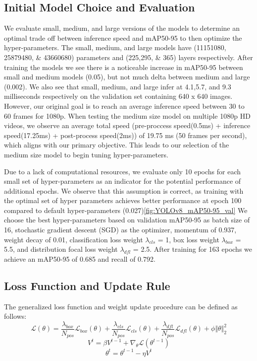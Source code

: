 \documentclass[10pt,twocolumn,letterpaper]{article}
\begin{document}
\subsection{Initial Model Choice and Evaluation}

We evaluate small, medium, and large versions of the models to determine an optimal trade off between inference speed and mAP50-95 to then optimize the hyper-parameters. The small, medium, and large models have (11151080, 25879480, \& 43660680) parameters and (225,295, \& 365) layers respectively. After training the models we see there is a noticeable increase in mAP50-95 between small and medium models (0.05), but not much delta between medium and large (0.002). We also see that small, medium, and large infer at 4.1,5.7, and 9.3 milliseconds respectively on the validation set containing 640 x 640 images. However, our original goal is to reach an average inference speed between 30 to 60 frames for 1080p. When testing the medium size model on multiple 1080p HD videos, we observe an average total speed (pre-proccess speed(0.5ms) + inference speed(17.25ms) + post-process speed(2ms)) of 19.75 ms (50 frames per second), which aligns with our primary objective. This leads to our selection of the medium size model to begin tuning hyper-parameters.

Due to a lack of computational resources, we evaluate only 10 epochs for each small set of hyper-parameters as an indicator for the potential performance of additional epochs. We observe that this assumption is correct, as training with the optimal set of hyper parameters achieves better performance at epoch 100 compared to default hyper-parameters (0.027)\ref{fig:YOLOv8_mAP50-95_val} We choose the best hyper-parameters based on validation mAP50-95 as batch size of 16, stochastic gradient descent (SGD) as the optimizer, momentum of 0.937, weight decay of 0.01, classification loss weight $\lambda_{cls}$ = 1, box loss weight $\lambda_{box}$ = 5.5, and distribution focal loss weight $\lambda_{dfl}$ = 2.5. After training for 163 epochs we achieve an mAP50-95 of 0.685 and recall of 0.792.

\subsection{Loss Function and Update Rule}
The generalized loss function and weight update procedure can be defined as follows: 
\begin{equation}\label{Generalized Loss}
\mathcal{L}(\theta) = \dfrac{\lambda_{box}}{N_{pos}}\mathcal{L}_{box}(\theta) + \dfrac{\lambda_{cls}}{N_{pos}}\mathcal{L}_{cls}(\theta) + \dfrac{\lambda_{dfl}}{N_{pos}}\mathcal{L}_{dfl}(\theta) + \phi\Vert \theta \Vert_2^2
\end{equation}    
\begin{equation}\label{Velocity}
V^t = \beta V^{t-1} + \nabla_{\theta}\mathcal{L}(\theta^{t-1})
\end{equation}    
\begin{equation}\label{Weight Update}
\theta^{t} = \theta^{t-1} - \eta V^{t}
\end{equation}
\end{document}
